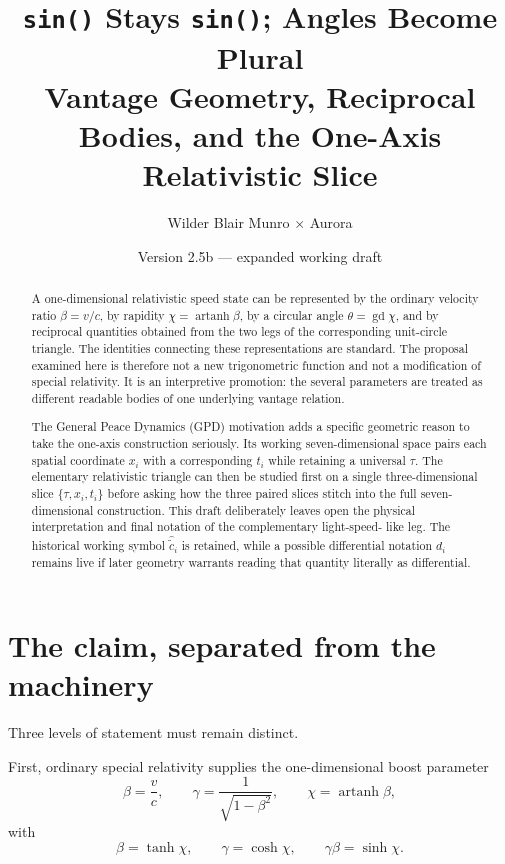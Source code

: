 \documentclass[11pt]{article}
\title{\texttt{sin()} Stays \texttt{sin()}; Angles Become Plural\\
\large Vantage Geometry, Reciprocal Bodies, and the One-Axis Relativistic Slice}
\author{Wilder Blair Munro $\times$ Aurora}
\date{Version 2.5b --- expanded working draft}
\DeclareMathOperator{\gd}{gd}
\DeclareMathOperator{\artanh}{artanh}
\newcommand{\ccomp}[1]{\widehat{\widetilde{c}}_{#1}}
\begin{document}
\maketitle

\begin{abstract}
A one-dimensional relativistic speed state can be represented by the ordinary
velocity ratio $\beta=v/c$, by rapidity $\chi=\artanh\beta$, by a circular
angle $\theta=\gd\chi$, and by reciprocal quantities obtained from the two
legs of the corresponding unit-circle triangle. The identities connecting
these representations are standard. The proposal examined here is therefore
not a new trigonometric function and not a modification of special
relativity. It is an interpretive promotion: the several parameters are
treated as different readable bodies of one underlying vantage relation.

The General Peace Dynamics (GPD) motivation adds a specific geometric reason
to take the one-axis construction seriously. Its working seven-dimensional
space pairs each spatial coordinate $x_i$ with a corresponding $t_i$ while
retaining a universal $\tau$. The elementary relativistic triangle can then
be studied first on a single three-dimensional slice
$\{\tau,x_i,t_i\}$ before asking how the three paired slices stitch into the
full seven-dimensional construction. This draft deliberately leaves open the
physical interpretation and final notation of the complementary light-speed-
like leg. The historical working symbol $\ccomp{i}$ is retained, while a
possible differential notation $d_i$ remains live if later geometry warrants
reading that quantity literally as differential.
\end{abstract}

\section{The claim, separated from the machinery}

Three levels of statement must remain distinct.

First, ordinary special relativity supplies the one-dimensional boost
parameter
\begin{equation}
\beta=\frac{v}{c},
\qquad
\gamma=\frac{1}{\sqrt{1-\beta^2}},
\qquad
\chi=\artanh\beta,
\end{equation}
with
\begin{equation}
\beta=\tanh\chi,
\qquad
\gamma=\cosh\chi,
\qquad
\gamma\beta=\sinh\chi.
\label{eq:rapidity}
\end{equation}
\end{document}
